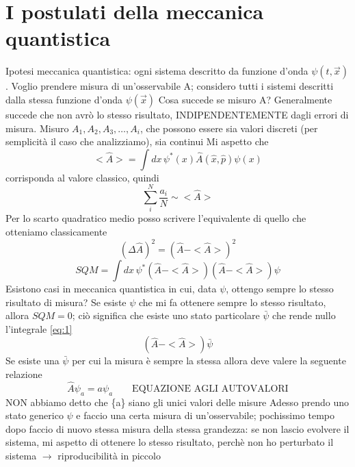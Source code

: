 \documentclass[a4paper,11pt]{report}
\theoremstyle{remark}
\theoremstyle{definition}
\begin{document}
\chapter{I postulati della meccanica quantistica}
Ipotesi meccanica quantistica: ogni sistema descritto da funzione d'onda $\psi(t,\vec{x})$. \newline
Voglio prendere misura di un'osservabile A; considero tutti i sistemi descritti dalla stessa funzione d'onda $\psi(\vec{x})$ \newline
Cosa succede se misuro A? Generalmente succede che non avrò lo stesso risultato, INDIPENDENTEMENTE dagli errori di misura. Misuro $A_1,A_2,A_3,\dots,A_i$, che possono essere sia valori discreti (per semplicità il caso che analizziamo), sia continui \newline
Mi aspetto che 
\begin{equation*}
    <\hat{A}> = \int dx \, \psi^*(x)\hat{A}(\hat{x},\hat{p})\psi(x)
\end{equation*}
corrisponda al valore classico, quindi
\begin{equation*}
    \sum_i^N \frac{a_i}{N} \sim <\hat{A}>
\end{equation*}
Per lo scarto quadratico medio posso scrivere l'equivalente di quello che otteniamo classicamente
\begin{equation*}
    {(\Delta \hat{A})}^2 = {(\hat{A}-<\hat{A}>)}^2  
\end{equation*}
\begin{equation}
    \label{eq:1}
    SQM = \int dx \, \psi^* (\hat{A}-<\hat{A}>)(\hat{A}-<\hat{A}>)\psi
\end{equation}
Esistono casi in meccanica quantistica in cui, data $\psi$, ottengo sempre lo stesso risultato di misura? \newline
Se esiste $\psi$ che mi fa ottenere sempre lo stesso risultato, allora $SQM = 0$; ciò significa che esiste uno stato particolare $\bar{\psi}$ che rende nullo l'integrale \ref{eq:1}
\begin{equation*}
    (\hat{A}-<\hat{A}>)\bar{\psi}
\end{equation*}
Se esiste una $\bar{\psi}$ per cui la misura è sempre la stessa allora deve valere la seguente relazione
\begin{equation*}
    \label{eq:autovalori}
    \hat{A}\psi_a = a\psi_a \qquad \text{EQUAZIONE AGLI AUTOVALORI}
\end{equation*}
NON abbiamo detto che \{a\} siano gli unici valori delle misure \newline
Adesso prendo uno stato generico $\psi$ e faccio una certa misura di un'osservabile; pochissimo tempo dopo faccio di nuovo stessa misura della stessa grandezza: se non lascio evolvere il sistema, mi aspetto di ottenere lo stesso risultato, perchè non ho perturbato il sistema $\rightarrow$ riproducibilità in piccolo \newline
\end{document}
